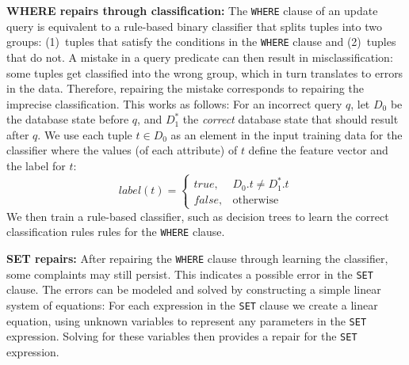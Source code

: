 \smallskip
\noindent
\textbf{WHERE repairs through classification:}
The \texttt{WHERE} clause of an update query is equivalent to a
rule-based binary classifier that splits tuples into two groups:
(1)~tuples that satisfy the conditions in the \texttt{WHERE} clause
and (2)~tuples that do not. A mistake in a query predicate can then
result in misclassification: some tuples get classified into the wrong
group, which in turn translates to errors in the data. Therefore,
repairing the mistake corresponds to repairing the imprecise
classification. This works as follows: For an incorrect query $q$, let
$D_0$ be the database state before $q$, and $D_1^*$ the \emph{correct}
database state that should result after $q$.
We use each tuple $t \in D_0$ as an element in the input training data
for the classifier where the values (of each attribute) of $t$ define
the feature vector and the label for $t$:
	\[
    label(t)= 
    \begin{cases}
    true ,& D_0.t \neq D_1^*.t\\
    false,              & \text{otherwise}
    \end{cases}
\]
We then train a rule-based classifier, 
such as decision trees \cite{quinlan1987} to learn
the correct classification rules rules for the \texttt{WHERE} clause.


\smallskip
\noindent
\textbf{SET repairs:}
After repairing the \texttt{WHERE} clause through learning the classifier, 
some complaints may still persist. This
indicates a possible error in the \texttt{SET} clause. The errors can
be modeled and solved by constructing a simple linear system of
equations: For each expression in the \texttt{SET} clause we create a
linear equation, using unknown variables to represent any parameters
in the \texttt{SET} expression. Solving for these variables then
provides a repair for the \texttt{SET} expression.


